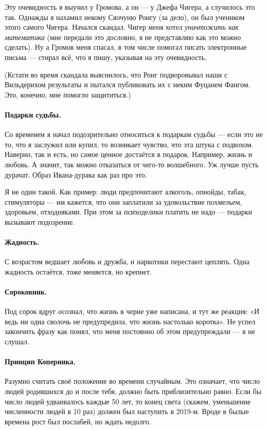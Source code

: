 \documentclass{book}
\begin{document}
Эту очевидность я выучил у Громова, а он --- у Джефа Чигера, а случилось это так.
Однажды я нахамил некому Сяочуню Ронгу (за дело), он был учеником этого самого Чигера.
Начался скандал.
Чигер меня хотел \textit{уничтожить как математика} (мне передали это дословно, я не представляю как это можно сделать).
Ну а Громов меня спасал, в том числе помогал писать электронные письма --- стирал всё, что я пишу, указывая на эту очевидность.

(Кстати во время скандала выяснилось, что Ронг подворовывал наши с Вильдерихом результаты и пытался публиковать их с неким Фуцанем Фангом.
Это, конечно, мне помогло защититься.)

\paragraph{Подарки судьбы.}
Со временем я начал подозрительно относиться к подаркам судьбы --- если это не то, что я заслужил или купил, то возникает чувство, что эта штука с подвохом.
Наверно, так и есть, но самое ценное достаётся в подарок.
Например, жизнь и любовь.
А значит, так можно отказаться от чего-то волшебного.
Уж лучше пусть дурачат.
Образ Ивана-дурака как раз про это.

Я не один такой.
Как пример: люди предпочитают алкоголь, опиойды, табак, стимуляторы --- им кажется, что они заплатили за удовольствие похмельем, здоровьем, отходняками.
При этом за психоделики платить не надо --- подарки вызывают подозрение.

\paragraph{Жадность.}
С возрастом ведшает любовь и дружба, и наркотики перестают цеплять.
Одна жадность остаётся, тоже меняется, но крепнет.

\paragraph{Сороковник.}
Под сорок вдруг осознал, что жизнь в черне уже написана,
и тут же реакция: «И ведь ни одна сволочь не предупредила, что жизнь настолько коротка».
Не успел закончить фразу как понял, что меня постоянно об этом предупреждали --- я не слушал.

\paragraph{Принцип Коперника.}
Разумно считать своё положение во времени случайным.
Это означает, что число людей родившихся до и после тебя, должно быть приблизительно равно.
Если бы число людей удваивалось каждые 50 лет, то конец света (скажем, уменьшение численности людей в 10 раз) должен был наступить в 2019-м.
Вроде в былые времена рост был послабей, но ждать недолго.
\end{document}
